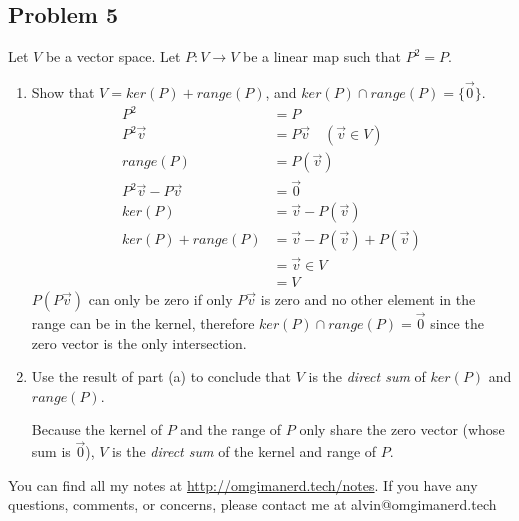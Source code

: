 \documentclass{math}
\begin{document}
\subsection*{Problem 5}
Let \( V \) be a vector space. Let \( P:V\to V \) be a linear map such that
\( P^2 = P \).
\begin{enumerate}
  \item Show that \( V = ker(P)+range(P) \), and \( ker(P)\cap range(P) =
  \{\vec{0}\} \).
  \begin{align*}
    P^2 &= P \\
    P^2\vec{v} &= P\vec{v} \quad (\vec{v}\in V) \\
    range(P) &= P(\vec{v}) \\
    P^2\vec{v}-P\vec{v} &= \vec{0} \\
    ker(P) &= \vec{v}-P(\vec{v}) \\
    ker(P)+range(P) &= \vec{v}-P(\vec{v})+P(\vec{v}) \\
    &= \vec{v}\in V \\
    &= V
  \end{align*}
  \( P(P\vec{v}) \) can only be zero if only \( P\vec{v} \) is zero and no
  other element in the range can be in the kernel, therefore \( ker(P)\cap
  range(P) = \vec{0} \) since the zero vector is the only intersection.
  \item Use the result of part (a) to conclude that \( V \) is the
  \textit{direct sum} of \( ker(P) \) and \( range(P) \). \par
  Because the kernel of \( P \) and the range of \( P \) only share the zero
  vector (whose sum is \( \vec{0} \)), \( V \) is the \textit{direct sum} of
  the kernel and range of \( P \).
\end{enumerate}

\begin{center}
  You can find all my notes at \url{http://omgimanerd.tech/notes}. If you have
  any questions, comments, or concerns, please contact me at
  alvin@omgimanerd.tech
\end{center}
\end{document}
